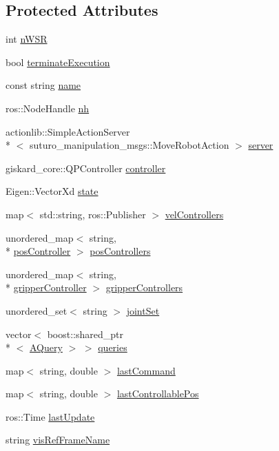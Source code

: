 \subsection*{Protected Attributes}
\begin{DoxyCompactItemize}
\item 
int \hyperlink{classGiskardActionServer_a027ef896e1d60656dc32b7fd827e00c1}{n\-W\-S\-R}
\item 
bool \hyperlink{classGiskardActionServer_acc7002280c576e183f1fc07a7450918e}{terminate\-Execution}
\item 
const string \hyperlink{classGiskardActionServer_ae1d480bfeed0f97334d25e1dfc868e67}{name}
\item 
ros\-::\-Node\-Handle \hyperlink{classGiskardActionServer_a9ff54b2b5811ca6a48b5147a3799697a}{nh}
\item 
actionlib\-::\-Simple\-Action\-Server\\*
$<$ suturo\-\_\-manipulation\-\_\-msgs\-::\-Move\-Robot\-Action $>$ \hyperlink{classGiskardActionServer_aec1639ae446055aff03685e3a3b0bda2}{server}
\item 
giskard\-\_\-core\-::\-Q\-P\-Controller \hyperlink{classGiskardActionServer_a72419de3a5237d2ee09ad92f1ed81da1}{controller}
\item 
Eigen\-::\-Vector\-Xd \hyperlink{classGiskardActionServer_ae79dc838a2d884755866e29d9c02dd77}{state}
\item 
map$<$ std\-::string, ros\-::\-Publisher $>$ \hyperlink{classGiskardActionServer_a4ea7edab163168d8c747f7d2e67b2f67}{vel\-Controllers}
\item 
unordered\-\_\-map$<$ string, \\*
\hyperlink{structGiskardActionServer_1_1posController}{pos\-Controller} $>$ \hyperlink{classGiskardActionServer_a972ee6ac1c1295b7c183cfea96ee4db1}{pos\-Controllers}
\item 
unordered\-\_\-map$<$ string, \\*
\hyperlink{structGiskardActionServer_1_1gripperController}{gripper\-Controller} $>$ \hyperlink{classGiskardActionServer_a20e66f4df22818fd6db1a78b4f9db129}{gripper\-Controllers}
\item 
unordered\-\_\-set$<$ string $>$ \hyperlink{classGiskardActionServer_af4c11bee852dc54f821c4aabbeec5d7c}{joint\-Set}
\item 
vector$<$ boost\-::shared\-\_\-ptr\\*
$<$ \hyperlink{structAQuery}{A\-Query} $>$ $>$ \hyperlink{classGiskardActionServer_ae8224875f2c3e1cba7f38a05c2d8985a}{queries}
\item 
map$<$ string, double $>$ \hyperlink{classGiskardActionServer_a965e4f058e16f29b8a6516d7fd6d45ad}{last\-Command}
\item 
map$<$ string, double $>$ \hyperlink{classGiskardActionServer_a02213acb96763c0283668a519903e440}{last\-Controllable\-Pos}
\item 
ros\-::\-Time \hyperlink{classGiskardActionServer_a549f8c868afd0fff8383fbbe512e4bfa}{last\-Update}
\item 
string \hyperlink{classGiskardActionServer_ab1ff77a2e75bc70378c6e763745593d1}{vis\-Ref\-Frame\-Name}
\end{DoxyCompactItemize}

